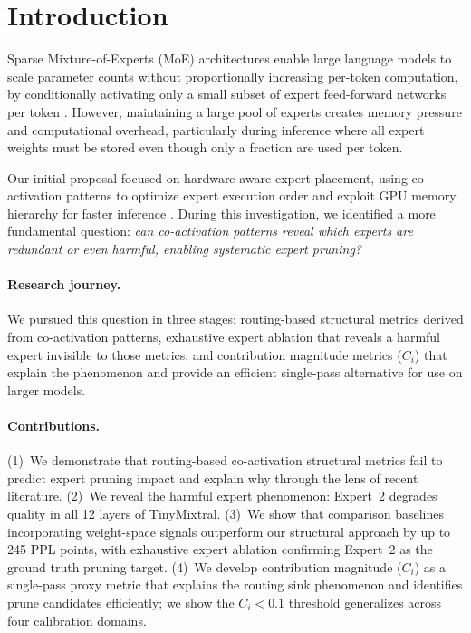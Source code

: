 \documentclass{article}
\begin{document}
\section{Introduction}

Sparse Mixture-of-Experts (MoE) architectures enable large language models to scale parameter counts without proportionally increasing per-token computation, by conditionally activating only a small subset of expert feed-forward networks per token \citep{shazeer2017moe,fedus2022switch}. However, maintaining a large pool of experts creates memory pressure and computational overhead, particularly during inference where all expert weights must be stored even though only a fraction are used per token.

Our initial proposal focused on hardware-aware expert placement, using co-activation patterns to optimize expert execution order and exploit GPU memory hierarchy for faster inference \citep{luo2025occult}. During this investigation, we identified a more fundamental question: \emph{can co-activation patterns reveal which experts are redundant or even harmful, enabling systematic expert pruning?}

\paragraph{Research journey.}
We pursued this question in three stages: routing-based structural metrics derived from co-activation patterns, exhaustive expert ablation that reveals a harmful expert invisible to those metrics, and contribution magnitude metrics ($C_i$) that explain the phenomenon and provide an efficient single-pass alternative for use on larger models.

\paragraph{Contributions.}
(1)~We demonstrate that routing-based co-activation structural metrics fail to predict expert pruning impact and explain why through the lens of recent literature. (2)~We reveal the harmful expert phenomenon: Expert~2 degrades quality in all 12 layers of TinyMixtral. (3)~We show that comparison baselines incorporating weight-space signals outperform our structural approach by up to 245 PPL points, with exhaustive expert ablation confirming Expert~2 as the ground truth pruning target. (4)~We develop contribution magnitude ($C_i$) as a single-pass proxy metric that explains the routing sink phenomenon and identifies prune candidates efficiently; we show the $C_i < 0.1$ threshold generalizes across four calibration domains.
\end{document}
